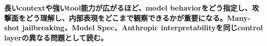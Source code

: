 \noindent\textbf{長いcontextや強いtool能力が広がるほど、model behaviorをどう指定し、攻撃面をどう理解し、内部表現をどこまで観察できるかが重要になる。Many-shot jailbreaking、Model Spec、Anthropic interpretabilityを同じcontrol layerの異なる問題として読む。}\autocite{src-018fb3abd44d,src-4ff5ab7d45bc,src-d1406200c99e}
